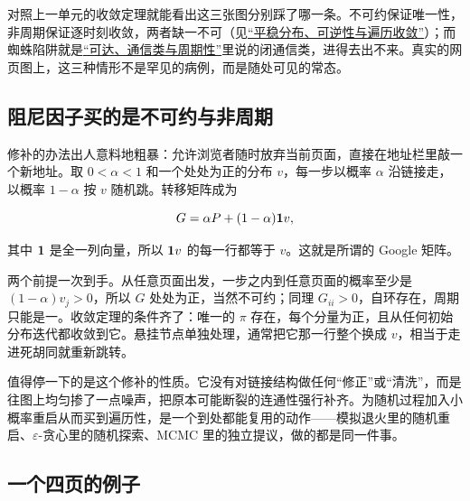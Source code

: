 对照上一单元的收敛定理就能看出这三张图分别踩了哪一条。不可约保证唯一性，非周期保证逐时刻收敛，两者缺一不可（见\hyperref[sec:06-Random-Processes/03-Markov-Chains/04]{``平稳分布、可逆性与遍历收敛''}）；而蜘蛛陷阱就是\hyperref[sec:06-Random-Processes/03-Markov-Chains/02]{``可达、通信类与周期性''}里说的闭通信类，进得去出不来。真实的网页图上，这三种情形不是罕见的病例，而是随处可见的常态。

\subsection{阻尼因子买的是不可约与非周期}

修补的办法出人意料地粗暴：允许浏览者随时放弃当前页面，直接在地址栏里敲一个新地址。取 \(0<\alpha<1\) 和一个处处为正的分布 \(v\)，每一步以概率 \(\alpha\) 沿链接走，以概率 \(1-\alpha\) 按 \(v\) 随机跳。转移矩阵成为

\[
G=\alpha P+(1-\alpha)\mathbf{1} v,
\]

其中 \(\mathbf{1}\) 是全一列向量，所以 \(\mathbf{1} v\) 的每一行都等于 \(v\)。这就是所谓的 Google 矩阵。

两个前提一次到手。从任意页面出发，一步之内到任意页面的概率至少是 \((1-\alpha)v_j>0\)，所以 \(G\) 处处为正，当然不可约；同理 \(G_{ii}>0\)，自环存在，周期只能是一。收敛定理的条件齐了：唯一的 \(\pi\) 存在，每个分量为正，且从任何初始分布迭代都收敛到它。悬挂节点单独处理，通常把它那一行整个换成 \(v\)，相当于走进死胡同就重新跳转。

值得停一下的是这个修补的性质。它没有对链接结构做任何``修正''或``清洗''，而是往图上均匀掺了一点噪声，把原本可能断裂的连通性强行补齐。为随机过程加入小概率重启从而买到遍历性，是一个到处都能复用的动作——模拟退火里的随机重启、\(\varepsilon\)-贪心里的随机探索、MCMC 里的独立提议，做的都是同一件事。

\subsection{一个四页的例子}

